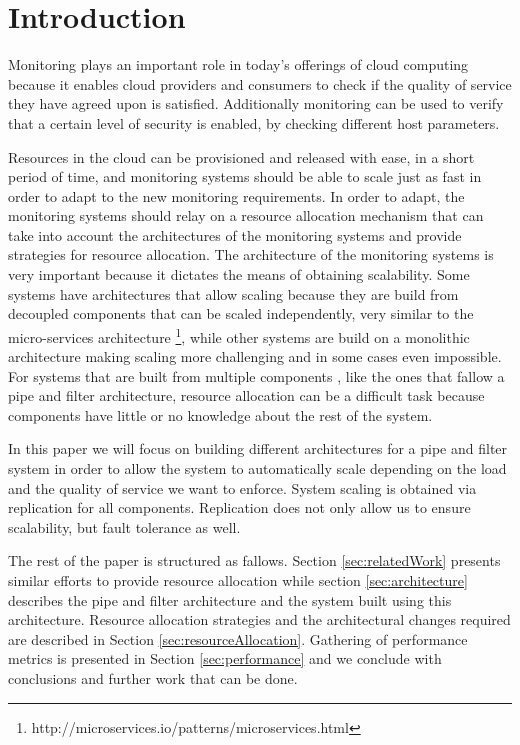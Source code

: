 \section*{Introduction}

Monitoring plays an important role in today's offerings of cloud computing because it enables cloud providers and consumers to check if the quality of service they have agreed upon is satisfied. Additionally monitoring can be used to verify that a certain level of security is enabled, by checking different host parameters.

Resources in the cloud can be provisioned and released with ease, in a short period of time, and monitoring systems should be able to scale just as fast in order to adapt to the new monitoring requirements. In order to adapt, the monitoring systems should relay on a resource allocation mechanism that can take into account the architectures of the monitoring systems and provide strategies for resource allocation. The architecture of the monitoring systems is very important because it dictates the means of obtaining scalability. Some systems have architectures that allow scaling because they are build from decoupled components that can be scaled independently, very similar to the micro-services architecture \footnote{http://microservices.io/patterns/microservices.html}, while other systems are build on a monolithic architecture making scaling more challenging and in some cases even impossible. For systems that are built from multiple components , like the ones that fallow a pipe and filter architecture, resource allocation can be a difficult task because components have little or no knowledge about the rest of the system.


In this paper we will focus on building different architectures for a pipe and filter system in order to allow the system to automatically scale depending on the load and the quality of service we want to enforce. System scaling is obtained via replication for all components. Replication does not only allow us to ensure scalability, but fault tolerance as well.

The rest of the paper is structured as fallows. Section \ref{sec:relatedWork} presents similar efforts to provide resource allocation while section \ref{sec:architecture} describes the pipe and filter architecture and the system built using this architecture. Resource allocation strategies and the architectural changes required are described in Section \ref{sec:resourceAllocation}. Gathering of performance metrics is presented in Section \ref{sec:performance} and we conclude with conclusions and further work that can be done.
